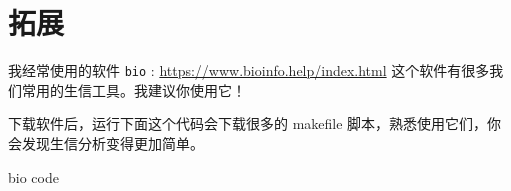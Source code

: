 \documentclass[]{ctexbook}
\newenvironment{Shaded}{\begin{snugshade}}{\end{snugshade}}
\newcommand{\ExtensionTok}[1]{#1}
\newcommand{\NormalTok}[1]{#1}
\begin{document}
\section{拓展}\label{ux62d3ux5c55}

我经常使用的软件 \texttt{bio} :
\url{https://www.bioinfo.help/index.html}
这个软件有很多我们常用的生信工具。我建议你使用它！

下载软件后，运行下面这个代码会下载很多的 makefile 脚本，熟悉使用它们，你会发现生信分析变得更加简单。

\begin{Shaded}
\begin{Highlighting}[]
\ExtensionTok{bio}\NormalTok{ code}
\end{Highlighting}
\end{Shaded}




\backmatter
\printindex
\end{document}
